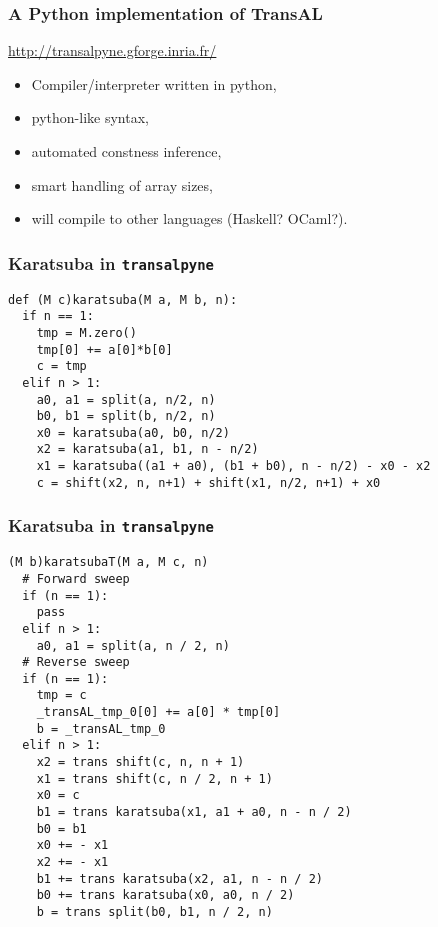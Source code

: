\documentclass[10pt]{beamer}
\newcommand{\tALpy}{\texttt{transalpyne}}
\begin{document}
\begin{frame}
  \frametitle{A Python implementation of TransAL}

  \begin{center}
    \Large
    \url{http://transalpyne.gforge.inria.fr/}
  \end{center}

  \begin{itemize}
  \item Compiler/interpreter written in python,
  \item python-like syntax,
  \item automated constness inference,
  \item smart handling of array sizes,
  \item will compile to other languages (Haskell? OCaml?).
  \end{itemize}
\end{frame}


\begin{frame}[fragile]
  \frametitle{Karatsuba in \tALpy}

\begin{lstlisting}
def (M c)karatsuba(M a, M b, n):
  if n == 1:
    tmp = M.zero()
    tmp[0] += a[0]*b[0]
    c = tmp
  elif n > 1:
    a0, a1 = split(a, n/2, n)
    b0, b1 = split(b, n/2, n)
    x0 = karatsuba(a0, b0, n/2)
    x2 = karatsuba(a1, b1, n - n/2)
    x1 = karatsuba((a1 + a0), (b1 + b0), n - n/2) - x0 - x2
    c = shift(x2, n, n+1) + shift(x1, n/2, n+1) + x0
\end{lstlisting}
\end{frame}


\begin{frame}[fragile]
  \frametitle{Karatsuba in \tALpy}

  \lstset{basicstyle=\ttfamily\footnotesize}
\begin{lstlisting}
(M b)karatsubaT(M a, M c, n)
  # Forward sweep
  if (n == 1):
    pass
  elif n > 1:
    a0, a1 = split(a, n / 2, n)
  # Reverse sweep
  if (n == 1):
    tmp = c
    _transAL_tmp_0[0] += a[0] * tmp[0]
    b = _transAL_tmp_0
  elif n > 1:
    x2 = trans shift(c, n, n + 1)
    x1 = trans shift(c, n / 2, n + 1)
    x0 = c
    b1 = trans karatsuba(x1, a1 + a0, n - n / 2)
    b0 = b1
    x0 += - x1
    x2 += - x1
    b1 += trans karatsuba(x2, a1, n - n / 2)
    b0 += trans karatsuba(x0, a0, n / 2)
    b = trans split(b0, b1, n / 2, n)
\end{lstlisting}
\end{frame}
\end{document}
